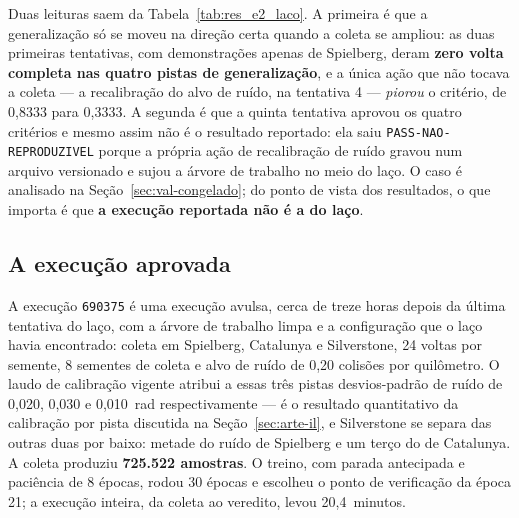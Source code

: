Duas leituras saem da Tabela~\ref{tab:res_e2_laco}. A primeira é que a
generalização só se moveu na direção certa quando a coleta se ampliou: as duas
primeiras tentativas, com demonstrações apenas de Spielberg, deram \textbf{zero
volta completa nas quatro pistas de generalização}, e a única ação que não tocava
a coleta --- a recalibração do alvo de ruído, na tentativa 4 --- \textit{piorou}
o critério, de 0,8333 para 0,3333. A segunda é que a quinta tentativa aprovou os
quatro critérios e mesmo assim não é o resultado reportado: ela saiu
\texttt{PASS-NAO-REPRODUZIVEL} porque a própria ação de recalibração de ruído
gravou num arquivo versionado e sujou a árvore de trabalho no meio do laço. O
caso é analisado na Seção~\ref{sec:val-congelado}; do ponto de vista dos
resultados, o que importa é que \textbf{a execução reportada não é a do laço}.

\subsection{A execução aprovada}

A execução \texttt{690375} é uma execução avulsa, cerca de treze horas depois da
última tentativa do laço, com a árvore de trabalho limpa e a configuração que o
laço havia encontrado: coleta em Spielberg, Catalunya e Silverstone, 24 voltas
por semente, 8 sementes de coleta e alvo de ruído de 0,20 colisões por
quilômetro. O laudo de calibração vigente atribui a essas três pistas
desvios-padrão de ruído de 0,020, 0,030 e 0,010~rad respectivamente --- é o
resultado quantitativo da calibração por pista discutida na
Seção~\ref{sec:arte-il}, e Silverstone se separa das outras duas por baixo:
metade do ruído de Spielberg e um terço do de Catalunya. A coleta produziu \textbf{725.522 amostras}. O treino, com parada
antecipada e paciência de 8 épocas, rodou 30 épocas e escolheu o ponto de
verificação da época 21; a execução inteira, da coleta ao veredito, levou
20,4~minutos.

